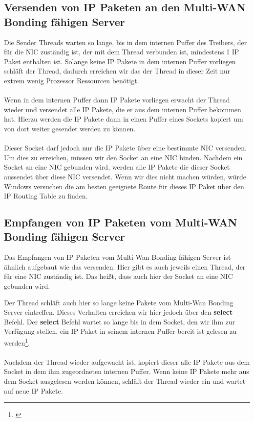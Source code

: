 \subsection{Versenden von IP Paketen an den Multi-WAN Bonding fähigen Server}
Die Sender Threads warten so lange, bis in dem internen Puffer des Treibers, der für die NIC zuständig ist, der mit dem Thread verbunden ist, mindestens 1 IP Paket enthalten ist. Solange keine IP Pakete in dem internen Puffer vorliegen schläft der Thread, dadurch erreichen wir das der Thread in dieser Zeit nur extrem wenig Prozessor Ressourcen benötigt.
\\\\
Wenn in dem internen Puffer dann IP Pakete vorliegen erwacht der Thread wieder und versendet alle IP Pakete, die er aus dem internen Puffer bekommen hat. Hierzu werden die IP Pakete dann in einen Puffer eines Sockets kopiert um von dort weiter gesendet werden zu können. 
\\\\
Dieser Socket darf jedoch nur die IP Pakete über eine bestimmte NIC versenden. Um dies zu erreichen, müssen wir den Socket an eine NIC binden. Nachdem ein Socket an eine NIC gebunden wird, werden alle IP Pakete die dieser Socket aussendet über diese NIC versendet. Wenn wir dies nicht machen würden, würde Windows versuchen die am besten geeignete Route für dieses IP Paket über den IP Routing Table zu finden.

\subsection{Empfangen von IP Paketen vom Multi-WAN Bonding fähigen Server}
Das Empfangen von IP Paketen vom Multi-Wan Bonding fähigen Server ist ähnlich aufgebaut wie das versenden. Hier gibt es auch jeweils einen Thread, der für eine NIC zuständig ist. Das heißt, dass auch hier der Socket an eine NIC gebunden wird.

\newpage
\noindent
Der Thread schläft auch hier so lange keine Pakete vom Multi-Wan Bonding Server eintreffen. Dieses Verhalten erreichen wir hier jedoch über den \textbf{select} Befehl. Der \textbf{select} Befehl wartet so lange bis in dem Socket, den wir ihm zur Verfügung stellen, ein IP Paket in seinem internen Puffer bereit ist gelesen zu werden\footnote[1]{\cite[Vgl.][]{18}}. 
\\\\
Nachdem der Thread wieder aufgewacht ist, kopiert dieser alle IP Pakete aus dem Socket in dem ihm zugeordneten internen Puffer. Wenn keine IP Pakete mehr aus dem Socket ausgelesen werden können, schläft der Thread wieder ein und wartet auf neue IP Pakete.
